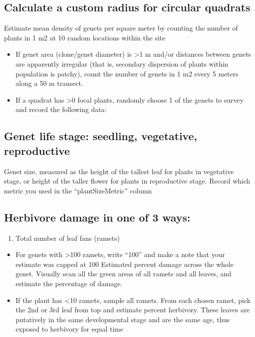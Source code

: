 \documentclass[
  letterpaper,
  oneside,
  open=any]{scrbook}
\providecommand{\tightlist}{%
  \setlength{\itemsep}{0pt}\setlength{\parskip}{0pt}}\usepackage{longtable,booktabs,array}
\begin{document}
\subsection{Calculate a custom radius for circular
quadrats}\label{calculate-a-custom-radius-for-circular-quadrats}

Estimate mean density of genets per square meter by counting the number
of plants in 1 m2 at 10 random locations within the site

\begin{itemize}
\tightlist
\item
  If genet area (clone/genet diameter) is \textgreater1 m and/or
  distances between genets are apparently irregular (that is, secondary
  dispersion of plants within population is patchy), count the number of
  genets in 1 m2 every 5 meters along a 50 m transect.
\item
  If a quadrat has \textgreater0 focal plants, randomly choose 1 of the
  genets to survey and record the following data:
\end{itemize}

\subsection{Genet life stage: seedling, vegetative,
reproductive}\label{genet-life-stage-seedling-vegetative-reproductive}

Genet size, measured as the height of the tallest leaf for plants in
vegetative stage, or height of the taller flower for plants in
reproductive stage. Record which metric you used in the
``plantSizeMetric'' column

\subsection{Herbivore damage in one of 3
ways:}\label{herbivore-damage-in-one-of-3-ways}

\begin{enumerate}
\def\labelenumi{\arabic{enumi}.}
\tightlist
\item
  Total number of leaf fans (ramets)
\end{enumerate}

\begin{itemize}
\item
  For genets with \textgreater100 ramets, write ``100'' and make a note
  that your estimate was capped at 100 Estimated percent damage across
  the whole genet. Visually scan all the green areas of all ramets and
  all leaves, and estimate the percentage of damage.
\item
  If the plant has \textless10 ramets, sample all ramets. From each
  chosen ramet, pick the 2nd or 3rd leaf from top and estimate percent
  herbivory. These leaves are putatively in the same developmental stage
  and are the same age, thus exposed to herbivory for equal time
\end{itemize}
\end{document}
